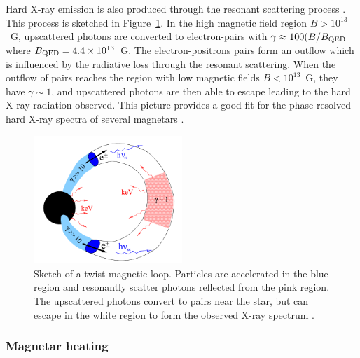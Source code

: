 Hard X-ray emission is also produced through the resonant scattering process \citep{2013ApJ...762...13B}.
This process is sketched in Figure~\ref{fig:magnetar-loop}.
In the high magnetic field region $B>10^{13}$~G, upscattered photons are converted to electron-pairs with $\gamma\approx 100(B/B_{\rm QED}$ where $B_{\rm QED}=4.4\times 10^{13}$~G.
The electron-positrons pairs form an outflow which is influenced by the radiative loss through the resonant scattering.
When the outflow of pairs reaches the region with low magnetic fields $B<10^{13}$~G, they have $\gamma\sim 1$, and upscattered photons are then able to escape leading to the hard X-ray radiation observed.
This picture provides a good fit for the phase-resolved hard X-ray spectra of several magnetars \citep{2014ApJ...786L...1H,2014ApJ...789...75V,2015ApJ...807...93A}.
%
\begin{figure}[h]
  \centering
  \includegraphics[width=0.5\textwidth]{pics/intro/magnetar-loop.png}
  \caption[Sketch of a twist magnetic loop.]{Sketch of a twist magnetic loop.
    Particles are accelerated in the blue region and resonantly scatter photons
    reflected from the pink region. The upscattered photons convert to pairs
    near the star, but can escape in the white region to form the observed X-ray
    spectrum \citep{2013ApJ...762...13B}.}
  \label{fig:magnetar-loop}
\end{figure}
%

\subsubsection{Magnetar heating}

